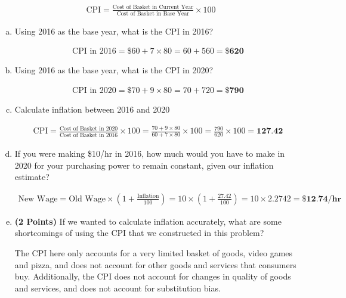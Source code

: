 \documentclass{article}
\begin{document}
\begin{align*}
    \text{CPI} = \frac{\text{Cost of Basket in Current Year}}{\text{Cost of Basket in Base Year}} \times 100
\end{align*}

\begin{enumerate}[(a)]
    \item Using 2016 as the base year, what is the CPI in 2016?

    \begin{align*}
        \text{CPI in 2016} = \$60 + 7 \times 80 = 60 + 560 = \textbf{\$620}
    \end{align*}

    \item Using 2016 as the base year, what is the CPI in 2020?
    
    \begin{align*}
        \text{CPI in 2020} = \$70 + 9 \times 80 = 70 + 720 = \textbf{\$790}
    \end{align*}

    \item Calculate inflation between 2016 and 2020
    
    \begin{align*}
        \text{CPI} = \frac{\text{Cost of Basket in 2020}}{\text{Cost of Basket in 2016}} \times 100 = \frac{70 + 9 \times 80}{60 + 7 \times 80} \times 100 = \frac{790}{620} \times 100 = \textbf{127.42}
    \end{align*}

    \item If you were making \$10/hr in 2016, how much would you have to make in 2020 for your purchasing power to remain constant, given our inflation estimate?
    
    \begin{align*}
        \text{New Wage} = \text{Old Wage} \times \left(1 + \frac{\text{Inflation}}{100}\right) = 10 \times \left(1 + \frac{27.42}{100}\right) = 10 \times 2.2742 = \textbf{\$12.74/hr}
    \end{align*}

    \item \textbf{(2 Points)} If we wanted to calculate inflation accurately, what are some shortcomings of using the CPI that we constructed in this problem?
    
    The CPI here only accounts for a very limited basket of goods, video games and pizza, and does not account for other goods and services that consumers buy. Additionally, the CPI does not account for changes in quality of goods and services, and does not account for substitution bias.

\end{enumerate}
\end{document}
